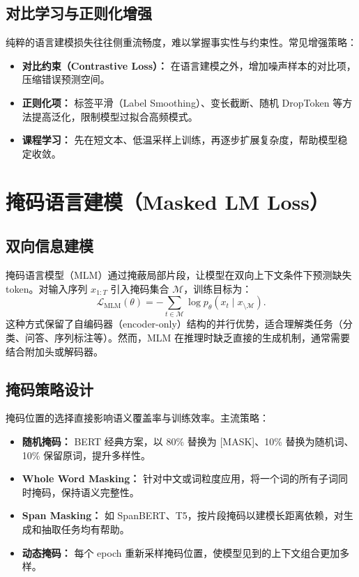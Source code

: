 \documentclass[UTF8,zihao=-4]{ctexart}
\begin{document}
\subsection{对比学习与正则化增强}
纯粹的语言建模损失往往侧重流畅度，难以掌握事实性与约束性。常见增强策略：
\begin{itemize}
  \item \textbf{对比约束（Contrastive Loss）：} 在语言建模之外，增加噪声样本的对比项，压缩错误预测空间。
  \item \textbf{正则化项：} 标签平滑（Label Smoothing）、变长截断、随机 DropToken 等方法提高泛化，限制模型过拟合高频模式。
  \item \textbf{课程学习：} 先在短文本、低温采样上训练，再逐步扩展复杂度，帮助模型稳定收敛。
\end{itemize}

\section{掩码语言建模（Masked LM Loss）}
\subsection{双向信息建模}
掩码语言模型（MLM）通过掩蔽局部片段，让模型在双向上下文条件下预测缺失 token。对输入序列 $x_{1:T}$ 引入掩码集合 $\mathcal{M}$，训练目标为：
\begin{equation}
  \mathcal{L}_{\text{MLM}}(\theta) = - \sum_{t \in \mathcal{M}} \log p_\theta(x_t \mid x_{\setminus \mathcal{M}}).
\end{equation}
这种方式保留了自编码器（encoder-only）结构的并行优势，适合理解类任务（分类、问答、序列标注等）。然而，MLM 在推理时缺乏直接的生成机制，通常需要结合附加头或解码器。

\subsection{掩码策略设计}
掩码位置的选择直接影响语义覆盖率与训练效率。主流策略：
\begin{itemize}
  \item \textbf{随机掩码：} BERT 经典方案，以 80\% 替换为 [MASK]、10\% 替换为随机词、10\% 保留原词，提升多样性。
  \item \textbf{Whole Word Masking：} 针对中文或词粒度应用，将一个词的所有子词同时掩码，保持语义完整性。
  \item \textbf{Span Masking：} 如 SpanBERT、T5，按片段掩码以建模长距离依赖，对生成和抽取任务均有帮助。
  \item \textbf{动态掩码：} 每个 epoch 重新采样掩码位置，使模型见到的上下文组合更加多样。
\end{itemize}
\end{document}
